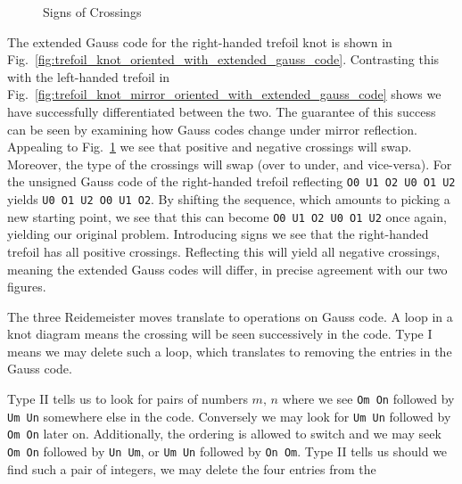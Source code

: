 \documentclass{article}
\theoremstyle{plain}
\begin{document}
        \begin{figure}
            \centering
            \caption{Signs of Crossings}
            \label{fig:crossing_signs}
        \end{figure}
        The extended Gauss code for the right-handed trefoil knot is shown in
        Fig.~\ref{fig:trefoil_knot_oriented_with_extended_gauss_code}.
        Contrasting this with the left-handed trefoil in
        Fig.~\ref{fig:trefoil_knot_mirror_oriented_with_extended_gauss_code}
        shows we have successfully differentiated between the two. The
        guarantee of this success can be seen by examining how Gauss codes
        change under mirror reflection. Appealing to
        Fig.~\ref{fig:crossing_signs} we see that positive and negative
        crossings will swap. Moreover, the type of the crossings will swap
        (over to under, and vice-versa). For the unsigned Gauss code of the
        right-handed trefoil
        reflecting \texttt{O0 U1 O2 U0 O1 U2} yields
        \texttt{U0 O1 U2 O0 U1 O2}. By shifting the sequence, which amounts
        to picking a new starting point, we see that this can become
        \texttt{O0 U1 O2 U0 O1 U2} once again, yielding our original problem.
        Introducing signs we see that the right-handed trefoil has all
        positive crossings. Reflecting this will yield all negative crossings,
        meaning the extended Gauss codes will differ, in precise agreement
        with our two figures.
        \par\hfill\par
        The three Reidemeister moves translate to operations on Gauss code.
        A loop in a knot diagram means the crossing will be seen successively
        in the code. Type I means we may delete such a loop, which translates
        to removing the entries in the Gauss code.
        \par\hfill\par
        Type II tells us to look for pairs of numbers $m,\,n$ where we see
        \texttt{Om On} followed by \texttt{Um Un} somewhere else in the code.
        Conversely we may look for \texttt{Um Un} followed by \texttt{Om On}
        later on. Additionally, the ordering is allowed to switch and we may
        seek \texttt{Om On} followed by \texttt{Un Um}, or
        \texttt{Um Un} followed by \texttt{On Om}. Type II tells us should we
        find such a pair of integers, we may delete the four entries from the
\end{document}
